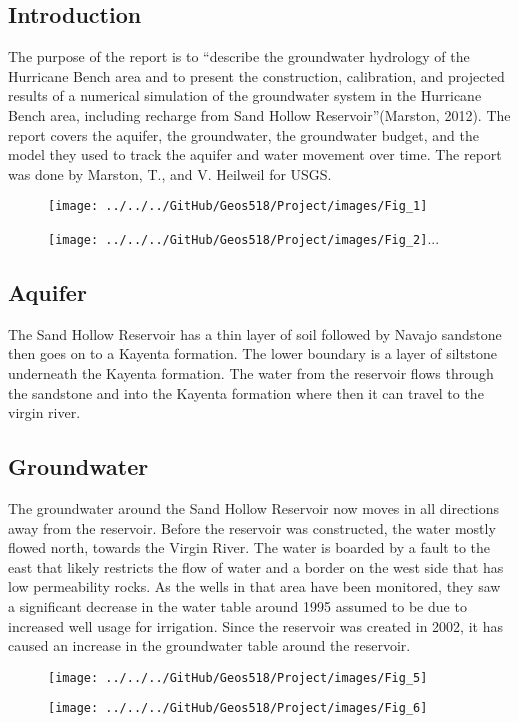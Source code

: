 \documentclass[]{report}
\begin{document}
\subsection{Introduction}
The purpose of the report is to “describe the groundwater hydrology of the Hurricane Bench area and to present the construction, calibration, and projected results of a numerical simulation of the groundwater system in the Hurricane Bench area, including recharge from Sand Hollow Reservoir”(Marston, 2012). The report covers the aquifer, the groundwater, the groundwater budget, and the model they used to track the aquifer and water movement over time. The report was done by Marston, T., and V. Heilweil for USGS.\\
\begin{figure}[h]
	\centering
	\begin{minipage}{0.4\textwidth}
		\texttt{[image: ../../../GitHub/Geos518/Project/images/Fig\_1]}
	\end{minipage}
	\hfill
	\begin{minipage}{0.4\textwidth}
		\texttt{[image: ../../../GitHub/Geos518/Project/images/Fig\_2]}...
	\end{minipage}
\end{figure}

\subsection{Aquifer}
The Sand Hollow Reservoir has a thin layer of soil followed by Navajo sandstone then goes on to a Kayenta formation. The lower boundary is a layer of siltstone underneath the Kayenta formation. The water from the reservoir flows through the sandstone and into the Kayenta formation where then it can travel to the virgin river.\\
\subsection{Groundwater}
The groundwater around the Sand Hollow Reservoir now moves in all directions away from the reservoir. Before the reservoir was constructed, the water mostly flowed north, towards the Virgin River. The water is boarded by a fault to the east that likely restricts the flow of water and a border on the west side that has low permeability rocks. As the wells in that area have been monitored, they saw a significant decrease in the water table around 1995 assumed to be due to increased well usage for irrigation. Since the reservoir was created in 2002, it has caused an increase in the groundwater table around the reservoir.\\
\begin{figure}[h]
	\centering
	\begin{minipage}{0.4\textwidth}
		\texttt{[image: ../../../GitHub/Geos518/Project/images/Fig\_5]}
	\end{minipage}
	\hfill
	\begin{minipage}{0.4\textwidth}
		\texttt{[image: ../../../GitHub/Geos518/Project/images/Fig\_6]}
	\end{minipage}
\end{figure}
\end{document}
